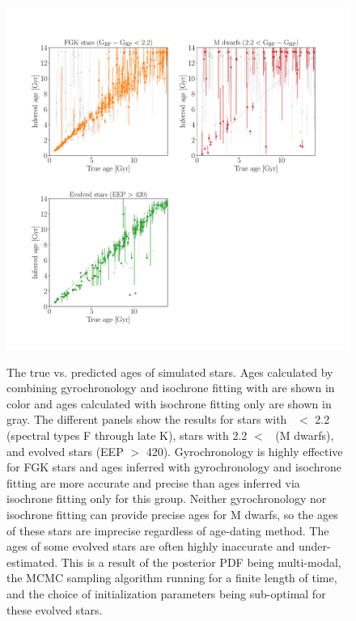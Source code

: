 \begin{figure}
  \caption{
The true vs. predicted ages of simulated stars.
    Ages calculated by combining gyrochronology
    and isochrone fitting with \sd are shown in color and ages calculated with
    isochrone fitting only are shown in gray.
The different panels show the results for stars
    with \gcolor\ $<$ 2.2 (spectral types F through late K),
    stars with 2.2 $<$ \gcolor\ (M dwarfs), and evolved stars (EEP $>$ 420).
Gyrochronology is highly effective for FGK stars and ages inferred with
    gyrochronology and isochrone fitting are more accurate and precise than
    ages inferred via isochrone fitting only for this group.
Neither gyrochronology nor isochrone fitting can provide precise ages for
    M dwarfs, so the ages of these stars are imprecise regardless of
    age-dating method.
The ages of some evolved stars are often highly inaccurate and under-estimated.
This is a result of the posterior PDF being multi-modal, the MCMC sampling
    algorithm running for a finite length of time, and the choice of
    initialization parameters being sub-optimal for these evolved stars.
}
  \centering
    \includegraphics[width=1\textwidth]{simulation_results}
\label{fig:simulation_results}
\end{figure}

